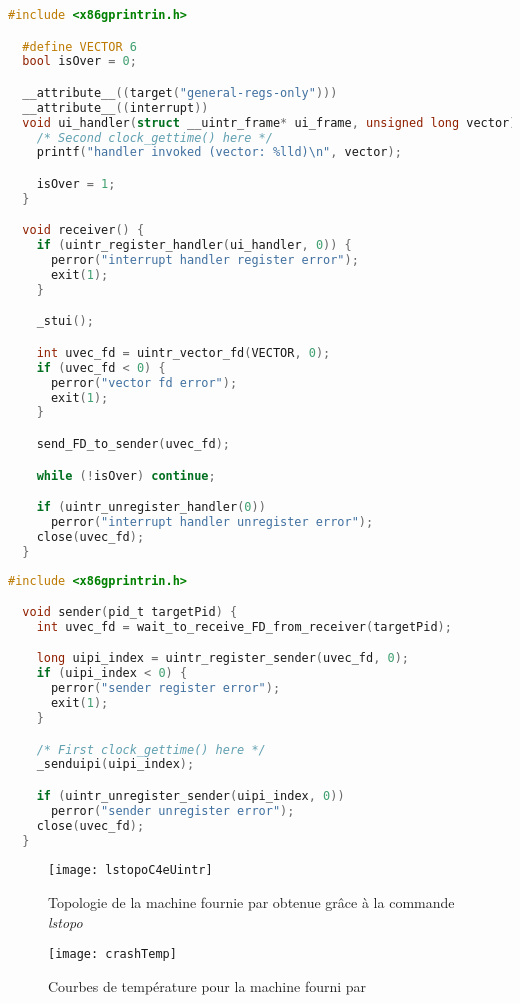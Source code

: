\begin{lstlisting}[language=c, caption=Code récepteur, label={lst:receiverCode}]
  #include <x86gprintrin.h>

  #define VECTOR 6
  bool isOver = 0;

  __attribute__((target("general-regs-only")))
  __attribute__((interrupt))
  void ui_handler(struct __uintr_frame* ui_frame, unsigned long vector) {
    /* Second clock_gettime() here */
    printf("handler invoked (vector: %lld)\n", vector);

    isOver = 1;
  }

  void receiver() {
    if (uintr_register_handler(ui_handler, 0)) {
      perror("interrupt handler register error");
      exit(1);
    }

    _stui();

    int uvec_fd = uintr_vector_fd(VECTOR, 0);
    if (uvec_fd < 0) {
      perror("vector fd error");
      exit(1);
    }

    send_FD_to_sender(uvec_fd);

    while (!isOver) continue;

    if (uintr_unregister_handler(0))
      perror("interrupt handler unregister error");
    close(uvec_fd);
  }
\end{lstlisting}

\begin{lstlisting}[language=c, caption=Code émetteur, label={lst:senderCode}]
  #include <x86gprintrin.h>

  void sender(pid_t targetPid) {
    int uvec_fd = wait_to_receive_FD_from_receiver(targetPid);

    long uipi_index = uintr_register_sender(uvec_fd, 0);
    if (uipi_index < 0) {
      perror("sender register error");
      exit(1);
    }

    /* First clock_gettime() here */
    _senduipi(uipi_index);

    if (uintr_unregister_sender(uipi_index, 0))
      perror("sender unregister error");
    close(uvec_fd);
  }
\end{lstlisting}

\begin{figure}[H]
  \texttt{[image: lstopoC4eUintr]}
  \caption{Topologie de la machine fournie par \atos{} obtenue grâce à la commande \emph{lstopo}}
  \label{fig:lstopo}
\end{figure}

\begin{figure}[H]
  \texttt{[image: crashTemp]}
  \caption{Courbes de température pour la machine fourni par \atos{}}
  \label{fig:crashTemp}
\end{figure}

